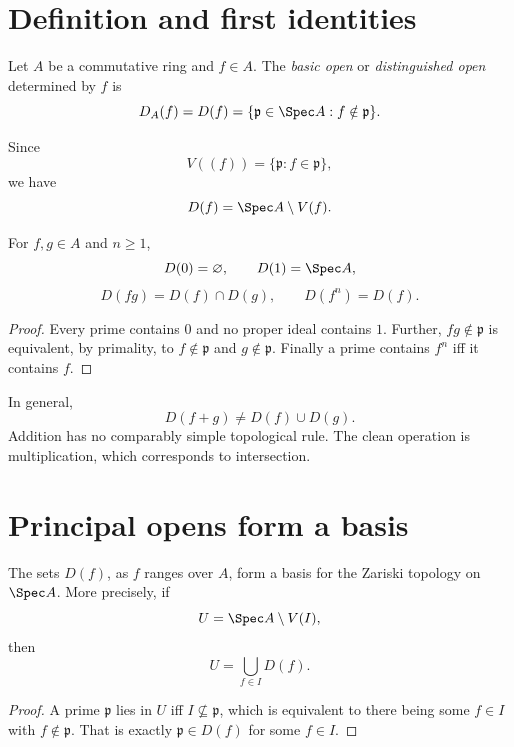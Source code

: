 \section{Definition and first identities}

\begin{definition}
Let $A$ be a commutative ring and $f\in A$.  The \emph{basic open} or
\emph{distinguished open} determined by $f$ is
\[
D_A(f)=D(f)=\{\mathfrak p\in\Spec A:f\notin\mathfrak p\}.
\]
\end{definition}

Since
\[
V((f))=\{\mathfrak p:f\in\mathfrak p\},
\]
we have
\[
D(f)=\Spec A\setminus V(f).
\]



\begin{proposition}
For $f,g\in A$ and $n\ge1$,
\[
D(0)=\varnothing,
\qquad
D(1)=\Spec A,
\]
\[
D(fg)=D(f)\cap D(g),
\qquad
D(f^n)=D(f).
\]
\end{proposition}

\begin{proof}
Every prime contains $0$ and no proper ideal contains $1$.  Further,
$fg\notin\mathfrak p$ is equivalent, by primality, to
$f\notin\mathfrak p$ and $g\notin\mathfrak p$.  Finally a prime contains $f^n$ iff it
contains $f$.
\end{proof}



\begin{remark}
In general,
\[
D(f+g)\neq D(f)\cup D(g).
\]
Addition has no comparably simple topological rule.  The clean operation is multiplication,
which corresponds to intersection.
\end{remark}

\section{Principal opens form a basis}

\begin{theorem}
The sets $D(f)$, as $f$ ranges over $A$, form a basis for the Zariski topology on $\Spec A$.
More precisely, if
\[
U=\Spec A\setminus V(I),
\]
then
\[
U=\bigcup_{f\in I}D(f).
\]
\end{theorem}

\begin{proof}
A prime $\mathfrak p$ lies in $U$ iff $I\not\subseteq\mathfrak p$, which is equivalent to
there being some $f\in I$ with $f\notin\mathfrak p$.  That is exactly
$\mathfrak p\in D(f)$ for some $f\in I$.
\end{proof}

